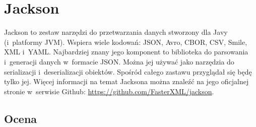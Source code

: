 \section{Jackson}
\label{jackson}
Jackson to zestaw narzędzi do przetwarzania danych stworzony dla Javy (i~platformy JVM).
Wspiera wiele kodowań: JSON, Avro, CBOR, CSV, Smile, XML i~YAML.
Najbardziej znany jego komponent to biblioteka do parsowania i~generacji danych w~formacie JSON.
Można jej używać jako narzędzia do serializacji i~deserializacji obiektów.
Spośród całego zastawu przyglądał się będę tylko jej.
Więcej informacji na temat Jacksona można znaleźć na jego oficjalnej stronie w~serwisie Github: \url{https://github.com/FasterXML/jackson}.

\subsection{Ocena}

